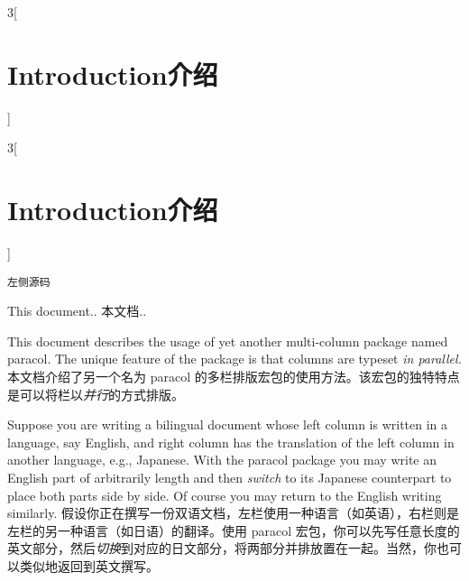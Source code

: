 \begin{paracol}{3}[\section{Introduction\hfill 介绍}]
\begin{VerbatimII}
\begin{paracol}{3}[\section{Introduction\hfill 介绍}]
\begin{Verbatim}
左侧源码
\end{Verbatim}
\switchcolumn
This document..
\switchcolumn
本文档..
\end{paracol}    
\end{VerbatimII}
\switchcolumn
This document describes the usage of yet another multi-column package named
\textsf{paracol}.  The unique feature of the package is that columns are
typeset {\em in parallel.}
\switchcolumn
本文档介绍了另一个名为 \textsf{paracol} 的多栏排版宏包的使用方法。该宏包的独特特点是可以将栏以{\em 并行}的方式排版。 

\switchcolumn[1]
Suppose you are writing a bilingual document whose left column is written in
a language, say English, and right column has the translation of the left
column in another language, e.g., Japanese.  With the \textsf{paracol}
package you may write an English part of arbitrarily length and then {\em
switch} to its Japanese counterpart to place both parts side by side.  Of
course you may return to the English writing similarly.
\switchcolumn
假设你正在撰写一份双语文档，左栏使用一种语言（如英语），右栏则是左栏的另一种语言（如日语）的翻译。使用 \textsf{paracol} 宏包，你可以先写任意长度的英文部分，然后{\em 切换}到对应的日文部分，将两部分并排放置在一起。当然，你也可以类似地返回到英文撰写。
\end{paracol}



